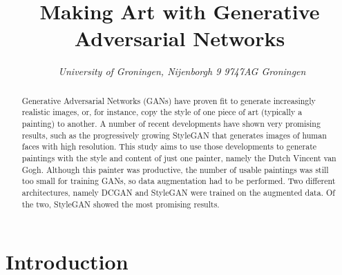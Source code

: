 \documentclass{article}
\title{\textbf{\huge Making Art with Generative Adversarial Networks}}
\author{Loran Knol (s3182541)\affila \and Thijs Havinga (s2922924)\affila \and Elisa Oostwal (s2468255) \affila \and Jeroen Overschie (s2995697) \affila \and}
\date{\affila\ \textit{University of Groningen, Nijenborgh 9 9747AG Groningen}}
\begin{document}
\ttl
\thispagestyle{empty}

\begin{abstract}
\noindent
Generative Adversarial Networks (GANs) have proven fit to generate increasingly realistic images, or, for instance, copy the style of one piece of art (typically a painting) to another. A number of recent developments have shown very promising results, such as the progressively growing StyleGAN \cite{karras2019stylebased} that generates images of human faces with high resolution. This study aims to use those developments to generate paintings with the style and content of just one painter, namely the Dutch Vincent van Gogh. Although this painter was productive, the number of usable paintings was still too small for training GANs, so data augmentation had to be performed. Two different architectures, namely DCGAN and StyleGAN were trained on the augmented data. Of the two, StyleGAN showed the most promising results.
\end{abstract}


% 






\section{Introduction}
\end{document}
